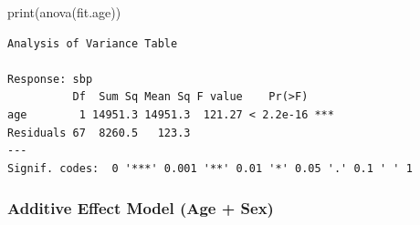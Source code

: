 \documentclass[
  letterpaper,
]{scrbook}
\newenvironment{Shaded}{\begin{snugshade}}{\end{snugshade}}
\newcommand{\FunctionTok}[1]{\textcolor[rgb]{0.28,0.35,0.67}{#1}}
\newcommand{\NormalTok}[1]{\textcolor[rgb]{0.00,0.23,0.31}{#1}}
\begin{document}
\begin{Shaded}
\begin{Highlighting}[]
\FunctionTok{print}\NormalTok{(}\FunctionTok{anova}\NormalTok{(fit.age))}
\end{Highlighting}
\end{Shaded}

\begin{verbatim}
Analysis of Variance Table

Response: sbp
          Df  Sum Sq Mean Sq F value    Pr(>F)    
age        1 14951.3 14951.3  121.27 < 2.2e-16 ***
Residuals 67  8260.5   123.3                      
---
Signif. codes:  0 '***' 0.001 '**' 0.01 '*' 0.05 '.' 0.1 ' ' 1
\end{verbatim}

\subsubsection{Additive Effect Model (Age +
Sex)}\label{additive-effect-model-age-sex}
\end{document}
